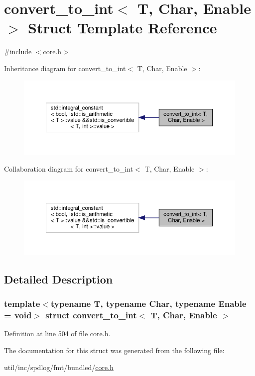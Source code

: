 \hypertarget{structconvert__to__int}{}\section{convert\+\_\+to\+\_\+int$<$ T, Char, Enable $>$ Struct Template Reference}
\label{structconvert__to__int}


{\ttfamily \#include $<$core.\+h$>$}



Inheritance diagram for convert\+\_\+to\+\_\+int$<$ T, Char, Enable $>$\+:
\nopagebreak
\begin{figure}[H]
\begin{center}
\leavevmode
\includegraphics[width=350pt]{structconvert__to__int__inherit__graph}
\end{center}
\end{figure}


Collaboration diagram for convert\+\_\+to\+\_\+int$<$ T, Char, Enable $>$\+:
\nopagebreak
\begin{figure}[H]
\begin{center}
\leavevmode
\includegraphics[width=350pt]{structconvert__to__int__coll__graph}
\end{center}
\end{figure}


\subsection{Detailed Description}
\subsubsection*{template$<$typename T, typename Char, typename Enable = void$>$\newline
struct convert\+\_\+to\+\_\+int$<$ T, Char, Enable $>$}



Definition at line 504 of file core.\+h.



The documentation for this struct was generated from the following file\+:\begin{DoxyCompactItemize}
\item 
util/inc/spdlog/fmt/bundled/\hyperlink{core_8h}{core.\+h}\end{DoxyCompactItemize}
